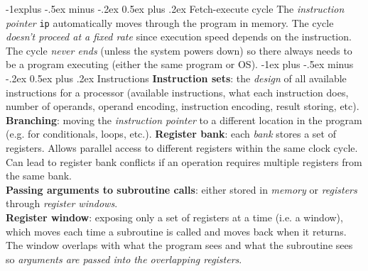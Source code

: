 \documentclass[10pt,landscape]{article}
\makeatletter
\renewcommand{\section}{\@startsection{section}{1}{0mm}%
                                {-1ex plus -.5ex minus -.2ex}%
                                {0.5ex plus .2ex}%
                                {\normalfont\small\bfseries}}
\renewcommand{\subsection}{\@startsection{subsection}{2}{0mm}%
                                {-1explus -.5ex minus -.2ex}%
                                {0.5ex plus .2ex}%
                                {\normalfont\scriptsize\bfseries}}
\makeatother
\begin{document}
\begin{multicols}{3}
\subsection{Fetch-execute cycle}
The \textit{instruction pointer} \texttt{ip} automatically moves through the program in memory. The cycle \textit{doesn't proceed at a fixed rate} since execution speed depends on the instruction. The cycle \textit{never ends} (unless the system powers down) so there always needs to be a program executing (either the same program or OS).
\section{Instructions}
\textbf{Instruction sets}: the \textit{design} of all available instructions for a processor (available instructions, what each instruction does, number of operands, operand encoding, instruction encoding, result storing, etc).\\
\textbf{Branching}: moving the \textit{instruction pointer} to a different location in the program (e.g. for conditionals, loops, etc.).
\textbf{Register bank}: each \textit{bank} stores a set of registers. Allows parallel access to different registers within the same clock cycle. Can lead to register bank conflicts if an operation requires multiple registers from the same bank. \\
\textbf{Passing arguments to subroutine calls}: either stored in \textit{memory} or \textit{registers} through \textit{register windows}.\\
\textbf{Register window}: exposing only a set of registers at a time (i.e. a window), which moves each time a subroutine is called and moves back when it returns. The window overlaps with what the program sees and what the subroutine sees so \textit{arguments are passed into the overlapping registers}.\\

\end{multicols}
\end{document}
